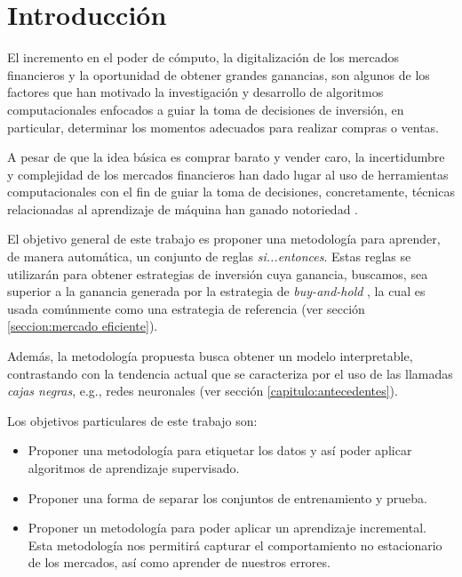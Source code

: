 \documentclass[12pt]{scrbook}
\theoremstyle{break}
\theoremstyle{break}
\newcommand{\buyhold}{\textit{buy-and-hold} }
\begin{document}

\chapter{Introducción}
\label{capitulo:introduccion}
El incremento en el poder de cómputo, la digitalización de los mercados financieros y la oportunidad de obtener grandes ganancias, son algunos de los factores que han motivado la investigación y desarrollo de algoritmos computacionales enfocados a guiar la toma de decisiones de inversión, en particular, determinar los momentos adecuados para realizar compras o ventas.

A pesar de que la idea básica es comprar barato y vender caro, la incertidumbre y complejidad de los mercados financieros han dado lugar al uso de herramientas computacionales con el fin de guiar la toma de decisiones, concretamente, técnicas relacionadas al aprendizaje de máquina han ganado notoriedad \cite{AdvancesMLFinance}.

El objetivo general de este trabajo es proponer una metodología para aprender, de manera automática, un conjunto de reglas \textit{si...entonces}. Estas reglas se utilizarán para obtener estrategias de inversión cuya ganancia, buscamos, sea superior a la ganancia generada por la estrategia de \buyhold, la cual es usada comúnmente como una estrategia de referencia (ver sección \ref{seccion:mercado eficiente}).

Además, la metodología propuesta busca obtener un modelo interpretable, contrastando con la tendencia actual que se caracteriza por el uso de las llamadas \textit{cajas negras}, e.g., redes neuronales (ver sección \ref{capitulo:antecedentes}).

Los objetivos particulares de este trabajo son:
\begin{itemize}

\item Proponer una metodología para etiquetar los datos y así poder aplicar algoritmos de aprendizaje supervisado.

\item Proponer una forma de separar los conjuntos de entrenamiento y prueba.

\item Proponer un metodología para poder aplicar un aprendizaje incremental. Esta metodología nos permitirá capturar el comportamiento no estacionario de los mercados, así como aprender de nuestros errores.
\end{itemize}
\end{document}
